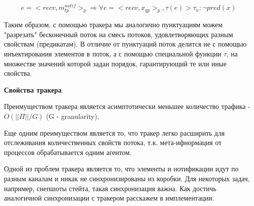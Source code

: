 \documentclass[12pt]{article}
\begin{document}
$$e = <recv,m^{notif}_{tp}>_p \Rightarrow \forall e = <recv,x_{qp}>_p, \tau(e) > \tau_n : \neg pred(x)$$

Таким образом, с помощью тракера мы аналогично пунктуациям можем "разрезать" бесконечный поток на смесь потоков, удовлетворяющих разным свойствам (предикатам). В отличие от пунктуаций поток делится не с помощью инъектирования элементов в поток, а с помощью специальной функции $\tau$, на множестве значений которой задан порядок, гарантирующий те или иные свойства.

\textbf{Свойства тракера}.

Преимуществом тракера является асимптотически меньшее количество трафика - $O(||\Pi|| / G)$ (G - granularity).

Еще одним преимуществом является то, что тракер легко расширить для отслеживания количественных свойств потока, т.к. мета-ифнормация от процессов обрабатывается одним агентом.

Одной из проблем тракера является то, что элементы и нотификации идут по разным каналам и никак не синхронизированы из коробки. Для некоторых задач, например, снепшоты стейта, такая синхронизация важна. Как достичь аналогичной синхронизации с тракером расскажем в имплементации.
\end{document}
